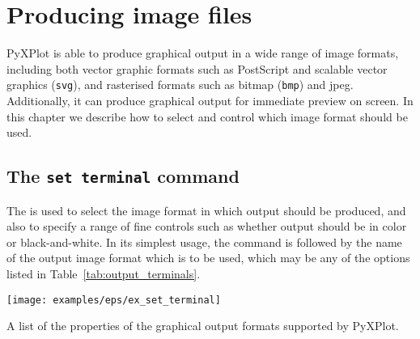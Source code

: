%
%
%
%
%



\chapter{Producing image files}
\label{ch:image_formats}

PyXPlot is able to produce graphical output in a wide range of image formats,
including both vector graphic formats such as PostScript and scalable vector
graphics ({\tt svg}), and rasterised formats such as bitmap ({\tt bmp}) and
jpeg. Additionally, it can produce graphical output for immediate preview on
screen. In this chapter we describe how to select and control which image
format should be used.

\section{The {\tt set terminal} command}
\label{sec:set_terminal}

The  is used to select the image format in which output
should be produced, and also to specify a range of fine controls such as
whether output should be in color or black-and-white. In its simplest usage,
the command is followed by the name of the output image format which is to be
used, which may be any of the options listed in Table~\ref{tab:output_terminals}.

\begin{table}
\centerline{\texttt{[image: examples/eps/ex\_set\_terminal]}}
\caption{A list of the properties of the graphical output formats supported by PyXPlot.}
\label{tab:output_terminals}
\end{table}

